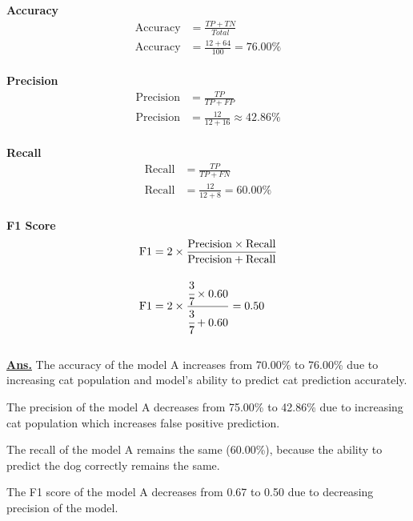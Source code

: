 \documentclass[12pt, a4paper]{article}
\newcommand{\ans}{\par\noindent\underline{\textbf{Ans.}} }
\begin{document}
\begin{enumerate}
            \noindent
            \begin{minipage}{0.5\textwidth}
                \centering
                \textbf{Accuracy}
                \begin{align*}
                    \text{Accuracy} &= \frac{TP + TN}{Total} \\[1em]
                    \text{Accuracy} &= \frac{12 + 64}{100} = 76.00\% \\[1em]
                \end{align*}
            \end{minipage}%
            \hfill
            \begin{minipage}{0.5\textwidth}
                \centering
                \textbf{Precision}
                \begin{align*}
                    \text{Precision} &= \frac{TP}{TP + FP} \\[1em]
                    \text{Precision} &= \frac{12}{12 + 16} \approx 42.86\% \\[1em]
                \end{align*}
            \end{minipage}
            \begin{minipage}{0.5\textwidth}
                \centering
                \textbf{Recall}
                \begin{align*}
                    \text{Recall} &= \frac{TP}{TP + FN} \\[1em]
                    \text{Recall} &= \frac{12}{12 + 8} = 60.00\% \\[1em]
                \end{align*}
            \end{minipage}%
            \hfill
            \begin{minipage}{0.5\textwidth}
                \centering
                \textbf{F1 Score}
                \begin{align*}
                    \text{F1} &= 2 \times \frac{\text{Precision} \times \text{Recall}}{\text{Precision} + \text{Recall}} \\[1em]
                    \text{F1} &= 2 \times \frac{\cfrac{3}{7} \times 0.60}{\cfrac{3}{7} + 0.60} = 0.50 \\[1em]
                \end{align*}
            \end{minipage}
        \pagebreak

            \ans The accuracy of the model A increases from 70.00\% to 76.00\% due to increasing cat population and model's ability to predict cat prediction accurately.

            The precision of the model A decreases from 75.00\% to 42.86\% due to increasing cat population which increases false positive prediction.

            The recall of the model A remains the same (60.00\%), because the ability to predict the dog correctly remains the same.

            The F1 score of the model A decreases from 0.67 to 0.50 due to decreasing precision of the model.

        \end{enumerate}
\end{document}
